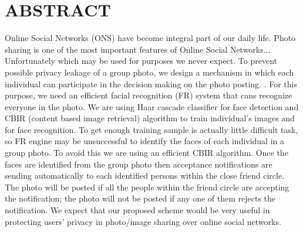 \chapter*{ABSTRACT}
\nointent
Online Social Networks (ONS) have become integral part of our daily life. Photo sharing is one of the most important features of Online Social Networks... Unfortunately which may be used for purposes we never expect. To prevent possible privacy leakage of a group photo, we design a mechanism in which each individual can participate in the decision making on the photo posting. . For this purpose, we need an efficient facial recognition (FR) system that cans recognize everyone in the photo. We are using  Haar cascade classifier for  face detection and CBIR (content based image retrieval) algorithm to train individual’s images and for face recognition. To get enough training sample is actually little difficult task, so FR engine may be unsuccessful to identify the faces of each individual in a group photo. To avoid this we are using an efficient CBIR algorithm. Once the faces are identified from the group photo then acceptance notifications are sending automatically to each identified persons within the close friend circle. The photo will be posted if all the people within the friend circle are accepting the notification; the photo will not be posted if any one of them rejects the notification. We expect that our proposed scheme would be very useful in protecting users’ privacy in photo/image sharing over online social networks.







